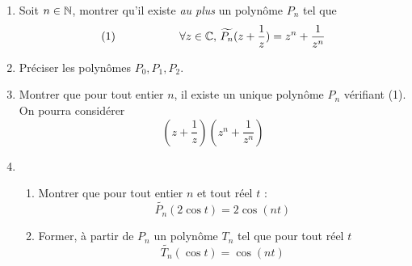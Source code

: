 \begin{enumerate}
\item Soit $n\in \mathbb{N}$, montrer qu'il existe \emph{au plus} un polyn{\^o}me $P_n$ tel que
\begin{displaymath}
(1)\hspace{2cm}     \forall z \in \mathbb{C}, \, \widetilde{P_n}(z+\frac{1}{z})=z^n+\frac{1}{z^n}
\end{displaymath}
\item Pr{\'e}ciser les polyn{\^o}mes $P_0, P_1, P_2$.
\item Montrer que pour tout entier $n$, il existe un unique polyn{\^o}me $P_n$ v{\'e}rifiant (1). \newline
  On pourra consid{\'e}rer
  \[(z+\frac{1}{z})(z^n+\frac{1}{z^n})\]

\item
 \begin{enumerate}
 \item Montrer que pour tout entier $n$ et tout r{\'e}el $t$ :
\begin{displaymath}
\widetilde{P_n}(2\cos t)= 2 \cos(nt) 
\end{displaymath}

 \item Former, {\`a} partir de $P_n$ un polyn{\^o}me $T_n$ tel que pour tout r{\'e}el $t$
\begin{displaymath}
 \widetilde{T_n}(\cos t)= \cos (nt)
\end{displaymath}
 \end{enumerate}
\end{enumerate}
